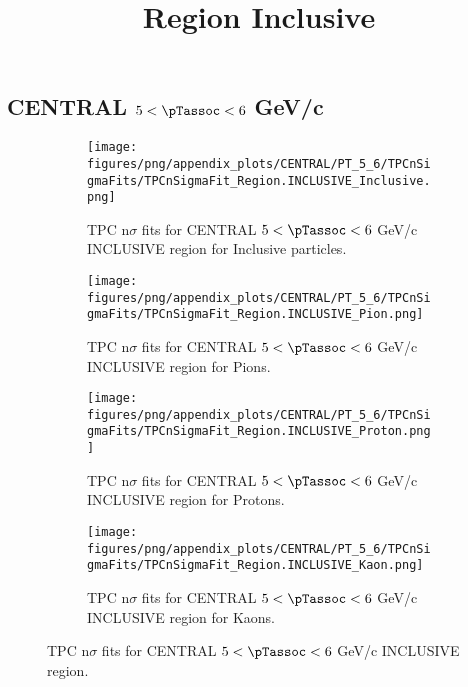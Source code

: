     
            \subsection*{CENTRAL $5 < \pTassoc < 6$ GeV/c}
            \begin{figure}[H]
                \title{Region Inclusive}
                \begin{subfigure}[b]{0.5\textwidth}
                    \centering
                    \texttt{[image: figures/png/appendix\_plots/CENTRAL/PT\_5\_6/TPCnSigmaFits/TPCnSigmaFit\_Region.INCLUSIVE\_Inclusive.png]}
                    \caption{TPC n$\sigma$ fits for CENTRAL $5 < \pTassoc < 6$ GeV/c INCLUSIVE region for Inclusive particles.}
                    \label{fig:appendix_CENTRAL_$5 < \pTassoc < 6$ GeV/c_INCLUSIVE_Inclusive}
                \end{subfigure}
                \begin{subfigure}[b]{0.5\textwidth}
                    \centering
                    \texttt{[image: figures/png/appendix\_plots/CENTRAL/PT\_5\_6/TPCnSigmaFits/TPCnSigmaFit\_Region.INCLUSIVE\_Pion.png]}
                    \caption{TPC n$\sigma$ fits for CENTRAL $5 < \pTassoc < 6$ GeV/c INCLUSIVE region for Pions.}
                    \label{fig:appendix_CENTRAL_$5 < \pTassoc < 6$ GeV/c_INCLUSIVE_Pion}
                \end{subfigure}
                \begin{subfigure}[b]{0.5\textwidth}
                    \centering
                    \texttt{[image: figures/png/appendix\_plots/CENTRAL/PT\_5\_6/TPCnSigmaFits/TPCnSigmaFit\_Region.INCLUSIVE\_Proton.png]}
                    \caption{TPC n$\sigma$ fits for CENTRAL $5 < \pTassoc < 6$ GeV/c INCLUSIVE region for Protons.}
                    \label{fig:appendix_CENTRAL_$5 < \pTassoc < 6$ GeV/c_INCLUSIVE_Proton}
                \end{subfigure}
                \begin{subfigure}[b]{0.5\textwidth}
                    \centering
                    \texttt{[image: figures/png/appendix\_plots/CENTRAL/PT\_5\_6/TPCnSigmaFits/TPCnSigmaFit\_Region.INCLUSIVE\_Kaon.png]}
                    \caption{TPC n$\sigma$ fits for CENTRAL $5 < \pTassoc < 6$ GeV/c INCLUSIVE region for Kaons.}
                    \label{fig:appendix_CENTRAL_$5 < \pTassoc < 6$ GeV/c_INCLUSIVE_Kaon}
                \end{subfigure}
                \caption{TPC n$\sigma$ fits for CENTRAL $5 < \pTassoc < 6$ GeV/c INCLUSIVE region.}
                \label{fig:appendix_CENTRAL_$5 < \pTassoc < 6$ GeV/c_INCLUSIVE}
            \end{figure}
